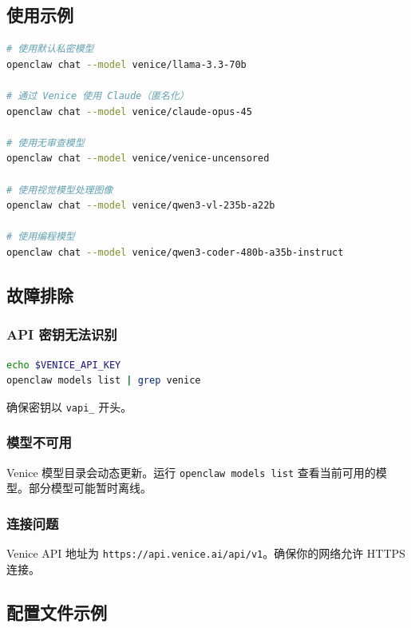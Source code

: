 \subsection{使用示例}


\begin{lstlisting}[language=bash]
# 使用默认私密模型
openclaw chat --model venice/llama-3.3-70b

# 通过 Venice 使用 Claude（匿名化）
openclaw chat --model venice/claude-opus-45

# 使用无审查模型
openclaw chat --model venice/venice-uncensored

# 使用视觉模型处理图像
openclaw chat --model venice/qwen3-vl-235b-a22b

# 使用编程模型
openclaw chat --model venice/qwen3-coder-480b-a35b-instruct
\end{lstlisting}


\subsection{故障排除}


\subsubsection{API 密钥无法识别}


\begin{lstlisting}[language=bash]
echo $VENICE_API_KEY
openclaw models list | grep venice
\end{lstlisting}


确保密钥以 \texttt{vapi\_} 开头。

\subsubsection{模型不可用}


Venice 模型目录会动态更新。运行 \texttt{openclaw models list} 查看当前可用的模型。部分模型可能暂时离线。

\subsubsection{连接问题}


Venice API 地址为 \texttt{https://api.venice.ai/api/v1}。确保你的网络允许 HTTPS 连接。

\subsection{配置文件示例}


